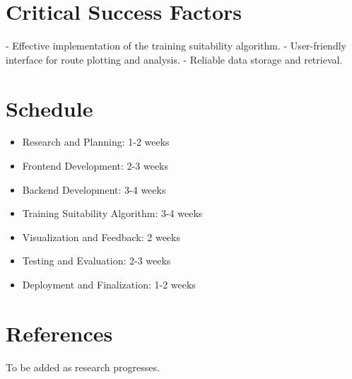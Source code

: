 \documentclass{article}
\begin{document}
    \section{Critical Success Factors}
    - Effective implementation of the training suitability algorithm.
    - User-friendly interface for route plotting and analysis.
    - Reliable data storage and retrieval.

    \section{Schedule}
    \begin{itemize}
        \item Research and Planning: 1-2 weeks
        \item Frontend Development: 2-3 weeks
        \item Backend Development: 3-4 weeks
        \item Training Suitability Algorithm: 3-4 weeks
        \item Visualization and Feedback: 2 weeks
        \item Testing and Evaluation: 2-3 weeks
        \item Deployment and Finalization: 1-2 weeks
    \end{itemize}

    \section{References}
    To be added as research progresses.

    
\end{document}
